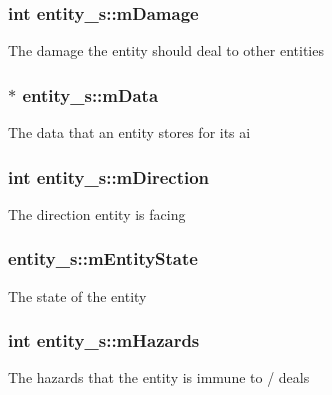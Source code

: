 \subsubsection[{\texorpdfstring{m\+Damage}{mDamage}}]{\setlength{\rightskip}{0pt plus 5cm}int entity\+\_\+s\+::m\+Damage}\hypertarget{structentity__s_aa0f5af86981e724016b355cf4848e0e7}{}\label{structentity__s_aa0f5af86981e724016b355cf4848e0e7}
The damage the entity should deal to other entities 
\subsubsection[{\texorpdfstring{m\+Data}{mData}}]{$\ast$ entity\+\_\+s\+::m\+Data}\hypertarget{structentity__s_aea03c4a26a1e35735484318548c63db6}{}\label{structentity__s_aea03c4a26a1e35735484318548c63db6}
The data that an entity stores for its ai 
\subsubsection[{\texorpdfstring{m\+Direction}{mDirection}}]{\setlength{\rightskip}{0pt plus 5cm}int entity\+\_\+s\+::m\+Direction}\hypertarget{structentity__s_a1c2e6077665e194128d01c8789f76941}{}\label{structentity__s_a1c2e6077665e194128d01c8789f76941}
The direction entity is facing 
\subsubsection[{\texorpdfstring{m\+Entity\+State}{mEntityState}}]{ entity\+\_\+s\+::m\+Entity\+State}\hypertarget{structentity__s_a4636f280b32796ffb0d647e1ce72898e}{}\label{structentity__s_a4636f280b32796ffb0d647e1ce72898e}
The state of the entity 
\subsubsection[{\texorpdfstring{m\+Hazards}{mHazards}}]{\setlength{\rightskip}{0pt plus 5cm}int entity\+\_\+s\+::m\+Hazards}\hypertarget{structentity__s_a85aba3f3deb7126edc63842086839c79}{}\label{structentity__s_a85aba3f3deb7126edc63842086839c79}
The hazards that the entity is immune to / deals 
